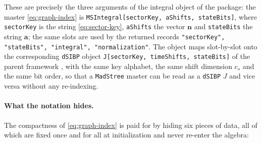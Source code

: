 \documentclass[11pt,a4paper]{article}
\begin{document}
These are precisely the three arguments of the integral object of the package: the master
\eqref{eq:graph-index} is \texttt{MSIntegral[sectorKey, aShifts, stateBits]}, where
\texttt{sectorKey} is the string \eqref{eq:sector-key}, \texttt{aShifts} the vector $\bm n$ and
\texttt{stateBits} the string $\bm a$; the same slots are used by the returned records
\texttt{"sectorKey", "stateBits", "integral", "normalization"}. The object maps
slot-by-slot onto the corresponding \texttt{dSIBP} object
\texttt{J[sectorKey, timeShifts, stateBits]} of the parent framework \cite{dSIBP:inPreparation},
with the same key alphabet, the same shift dimension $c_s$ and the same bit order, so that a
\texttt{MadStree} master can be read as a \texttt{dSIBP} $J$ and vice versa without any re-indexing.

\paragraph{What the notation hides.}
The compactness of \eqref{eq:graph-index} is paid for by hiding six pieces of data, all of which
are fixed once and for all at initialization and never re-enter the algebra:
\end{document}
